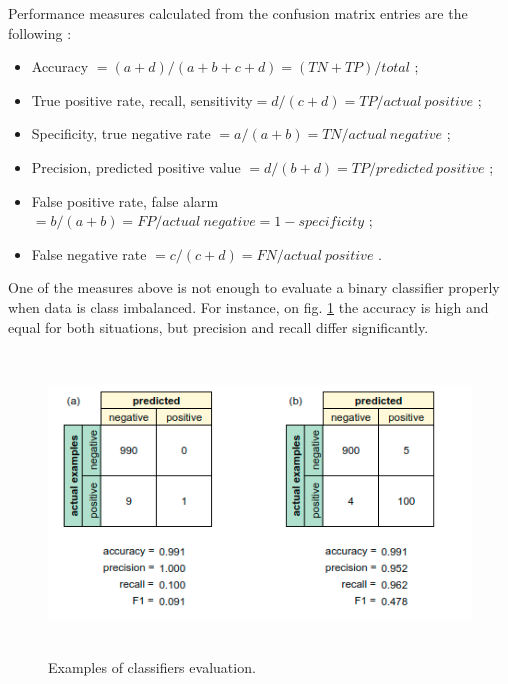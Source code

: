 Performance measures calculated from the confusion matrix entries are
the following \citep{kohavi:glossary}:
\begin{itemize}
    \item Accuracy $= (a + d)/(a + b + c + d) =
    (TN + TP)/total$ ;
    \item True positive rate, recall, sensitivity$ =
    d/(c + d) = TP/actual\: positive$ ;
    \item Specificity, true negative rate $= a/(a + b) =
    TN/actual\: negative$ ; 
    \item Precision, predicted positive value $=
    d/(b + d) = TP/predicted\: positive$ ;
    \item False positive rate, false alarm $= b/(a + b)
    = FP/actual\: negative = 1 - specificity$ ;
    \item False negative rate $= c/(c + d) = FN/actual\: positive$ .
\end{itemize}

One of the measures above is not enough to evaluate a binary classifier properly when data is class imbalanced. For instance, on fig. \ref{fig:classifiers-evaluation} the accuracy is high and equal for both situations, but precision and recall differ significantly. 

\begin{figure}[h]
    \centering
    \includegraphics[height=8cm]{Images/Classifiers-evaluation.png}
    \caption{Examples of classifiers evaluation.}
    \label{fig:classifiers-evaluation}
\end{figure}

